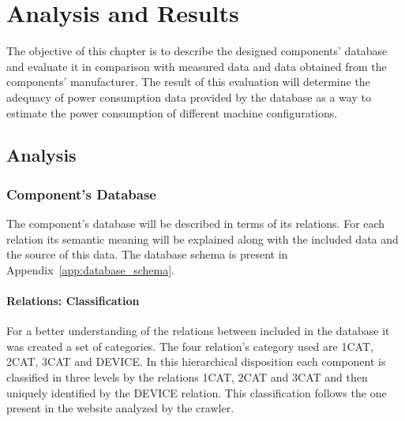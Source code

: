

\chapter{Analysis and Results} \label{chap4:analysis_results}
%
    The objective of this chapter is to describe the designed components' database and evaluate it in comparison with measured data and data obtained from the components' manufacturer. The result of this evaluation will determine the adequacy of power consumption data provided by the database as a way to estimate the power consumption of different machine configurations.
    
\section{Analysis} \label{sec4:analysis}
\subsection{Component's Database} \label{sec4:component_database}
    The component's database will be described in terms of its relations. For each relation its semantic meaning will be explained along with the included data and the source of this data. The database schema is present in Appendix~\ref{app:database_schema}.

    \subsubsection*{Relations: Classification}
        For a better understanding of the relations between included in the database it was created a set of categories. The four relation's category used are 1CAT, 2CAT, 3CAT and DEVICE. In this hierarchical disposition each component is classified in three levels by the relations 1CAT, 2CAT and 3CAT and then uniquely identified by the DEVICE relation. This classification follows the one present in the website analyzed by the crawler.

